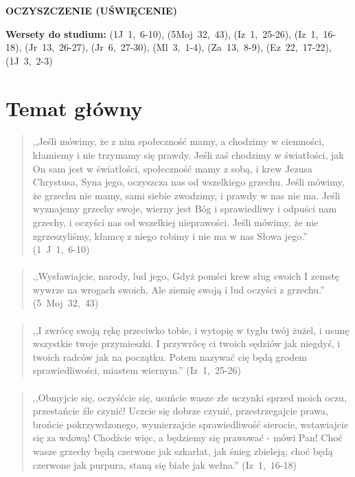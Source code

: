 \documentclass[10pt,a4paper,oneside]{article}
\begin{document}
\centerline{\textbf{\MakeUppercase{Oczyszczenie (uświęcenie)}}}
\begin{center}
\textbf{Wersety do studium:} \mbox{(1J 1, 6-10)}, \mbox{(5Moj 32, 43)}, \mbox{(Iz 1, 25-26)}, \mbox{(Iz 1, 16-18)}, \mbox{(Jr 13, 26-27)}, \mbox{(Jr 6, 27-30)}, \mbox{(Ml 3, 1-4)}, \mbox{(Za 13, 8-9)}, \mbox{(Ez 22, 17-22)}, \mbox{(1J 3, 2-3)}
\end{center}
\section{Temat główny}
\paragraph{}
\begin{quote}
,,Jeśli mówimy, że z nim społeczność mamy, a chodzimy w ciemności, kłamiemy i nie trzymamy się prawdy. Jeśli zaś chodzimy w światłości, jak On sam jest w światłości, społeczność mamy z sobą, i krew Jezusa Chrystusa, Syna jego, oczyszcza nas od wszelkiego grzechu. Jeśli mówimy, że grzechu nie mamy, sami siebie zwodzimy, i prawdy w nas nie ma. Jeśli wyznajemy grzechy swoje, wierny jest Bóg i sprawiedliwy i odpuści nam grzechy, i oczyści nas od wszelkiej nieprawości. Jeśli mówimy, że nie zgrzeszyliśmy, kłamcę z niego robimy i nie ma w nas Słowa jego.'' \mbox{(1 J 1, 6-10)}
\end{quote}
\paragraph{}
\begin{quote}
,,Wysławiajcie, narody, lud jego, Gdyż pomści krew sług swoich I zemstę wywrze na wrogach swoich, Ale ziemię swoją i lud oczyści z grzechu.'' \mbox{(5 Moj 32, 43)}
\end{quote}
\paragraph{}
\begin{quote}
,,I zwrócę swoją rękę przeciwko tobie, i wytopię w tyglu twój żużel, i usunę wszystkie twoje przymieszki. I przywrócę ci twoich sędziów jak niegdyś, i twoich radców jak na początku. Potem nazywać cię będą grodem sprawiedliwości, miastem wiernym.'' \mbox{(Iz 1, 25-26)}
\end{quote}
\paragraph{}
\begin{quote}
,,Obmyjcie się, oczyśćcie się, usuńcie wasze złe uczynki sprzed moich oczu, przestańcie źle czynić! Uczcie się dobrze czynić, przestrzegajcie prawa, brońcie pokrzywdzonego, wymierzajcie sprawiedliwość sierocie, wstawiajcie się za wdową! Chodźcie więc, a będziemy się prawować - mówi Pan! Choć wasze grzechy będą czerwone jak szkarłat, jak śnieg zbieleją; choć będą czerwone jak purpura, staną się białe jak wełna.'' \mbox{(Iz 1, 16-18)}
\end{quote}
\end{document}
